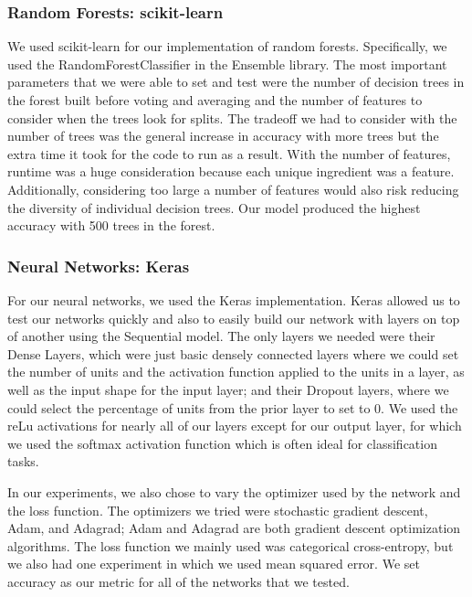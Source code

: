 \documentclass[11pt]{article}
\begin{document}
\subsubsection{Random Forests: scikit-learn}
We used scikit-learn for our implementation of random forests. Specifically, we used the RandomForestClassifier in the Ensemble library. The most important parameters that
we were able to set and test were the number of decision trees in the forest built before voting and averaging and the number of features to consider when the trees look for splits. The tradeoff we had to consider with the number of trees was the general increase in accuracy with more trees but the extra time it took for the code to run as a result.
With the number of features, runtime was a huge consideration because each unique ingredient was a feature. Additionally, considering too large a number of features would also risk
reducing the diversity of individual decision trees. Our model produced the highest accuracy with 500 trees in the forest.

\subsubsection{Neural Networks: Keras}
For our neural networks, we used the Keras implementation. Keras allowed us to test our networks quickly and also to easily build our network with layers on top of another using
the Sequential model. The only layers we needed were their Dense Layers, which were just basic densely connected layers where we could set the number of units and the activation function applied to the units in a layer, as well as the input shape for the input layer; and their Dropout layers, where we could select the percentage of units from the prior layer to set to 0. We used the reLu activations for nearly all of our layers except for our output layer, for which we used the softmax activation function which is often
ideal for classification tasks.

In our experiments, we also chose to vary the optimizer used by the network and the loss function. The optimizers we tried were stochastic gradient descent, Adam, and Adagrad; Adam and Adagrad are both gradient descent optimization algorithms. The loss function we mainly used was categorical cross-entropy, but we also had one experiment in which we used mean squared error. We set accuracy as our metric for all of the networks that we tested.
\end{document}
